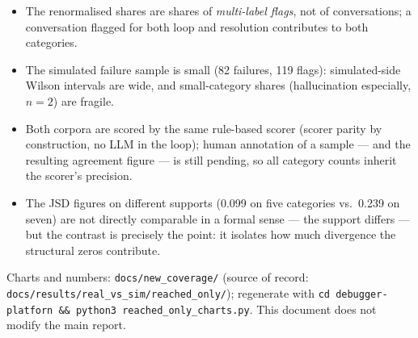 \documentclass[11pt,a4paper]{article}
\begin{document}
\begin{itemize}[nosep]
  \item The renormalised shares are shares of \emph{multi-label flags}, not of conversations; a
        conversation flagged for both loop and resolution contributes to both categories.
  \item The simulated failure sample is small (82 failures, 119 flags): simulated-side Wilson
        intervals are wide, and small-category shares (hallucination especially, $n{=}2$) are
        fragile.
  \item Both corpora are scored by the same rule-based scorer (scorer parity by construction, no
        LLM in the loop); human annotation of a sample --- and the resulting agreement figure ---
        is still pending, so all category counts inherit the scorer's precision.
  \item The JSD figures on different supports (0.099 on five categories vs.\ 0.239 on seven) are
        not directly comparable in a formal sense --- the support differs --- but the contrast is
        precisely the point: it isolates how much divergence the structural zeros contribute.
\end{itemize}

\vspace{1em}
\noindent\small
Charts and numbers: \texttt{docs/new\_coverage/} (source of record:
\texttt{docs/results/real\_vs\_sim/reached\_only/}); regenerate with
\texttt{cd debugger-platforn \&\& python3 reached\_only\_charts.py}. This document does not modify
the main report.
\end{document}
